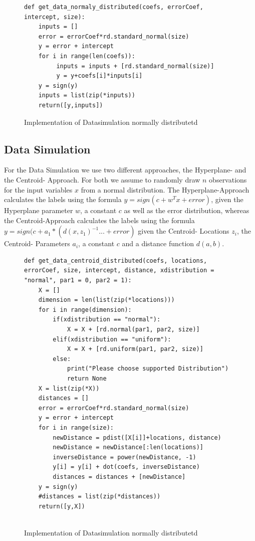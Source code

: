 \documentclass[a4paper]{article}
\begin{document}
\begin{figure}[!htb]
\begin{center}
\begin{lstlisting}
def get_data_normaly_distributed(coefs, errorCoef, intercept, size):
	inputs = []
	error = errorCoef*rd.standard_normal(size)
	y = error + intercept
	for i in range(len(coefs)):
		 inputs = inputs + [rd.standard_normal(size)]		 
		 y = y+coefs[i]*inputs[i]
	y = sign(y)
	inputs = list(zip(*inputs))
	return([y,inputs])
\end{lstlisting}
\caption{Implementation of Datasimulation normally distributetd}
\label{fig1}
\end{center}
\end{figure}
\subsection{Data Simulation}
For the Data Simulation we use two different approaches, the Hyperplane- and the Centroid- Approach. For both we assume to randomly draw $n$ observations for the input variables $x$ from a normal distribution. The Hyperplane-Approach calculates the labels using the formula $y= sign(c+ w^T x + error)$, given the Hyperplane parameter $w$, a constant $c$ as well as the error distribution, whereas the Centroid-Approach calculates the labels using the formula $y= sign(c + a_1*(d(x,z_1)^{-1}... + error)$ given the Centroid- Locations $z_i$, the Centroid- Parameters  $a_i$, a constant $c$ and a distance function $d(a,b)$.


\begin{figure}[!htb]
\begin{center}
\begin{lstlisting}
def get_data_centroid_distributed(coefs, locations, errorCoef, size, intercept, distance, xdistribution = "normal", par1 = 0, par2 = 1):
	X = []
	dimension = len(list(zip(*locations)))
	for i in range(dimension):
		if(xdistribution == "normal"):		
			X = X + [rd.normal(par1, par2, size)]
		elif(xdistribution == "uniform"):
			X = X + [rd.uniform(par1, par2, size)]
		else:
			print("Please choose supported Distribution")
			return None	
	X = list(zip(*X))
	distances = []
	error = errorCoef*rd.standard_normal(size)
	y = error + intercept
	for i in range(size):	
		newDistance = pdist([X[i]]+locations, distance)
		newDistance = newDistance[:len(locations)]
		inverseDistance = power(newDistance, -1)
		y[i] = y[i] + dot(coefs, inverseDistance)
		distances = distances + [newDistance]
	y = sign(y)
	#distances = list(zip(*distances))
	return([y,X])	
	
\end{lstlisting}
\caption{Implementation of Datasimulation normally distributetd}
\label{fig1}
\end{center}
\end{figure}
\end{document}
